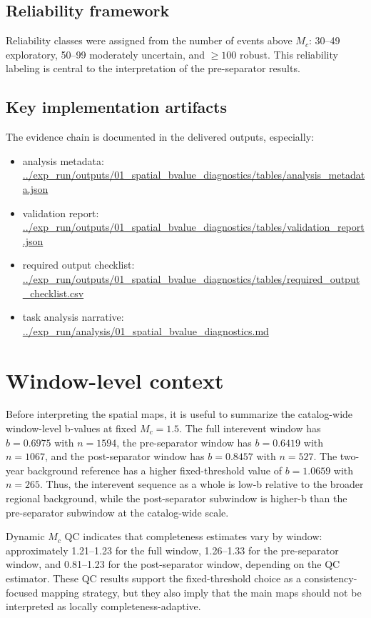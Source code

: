 \documentclass[11pt]{article}
\begin{document}
\subsection{Reliability framework}
Reliability classes were assigned from the number of events above $M_c$: 30--49 exploratory, 50--99 moderately uncertain, and $\ge 100$ robust. This reliability labeling is central to the interpretation of the pre-separator results.

\subsection{Key implementation artifacts}
The evidence chain is documented in the delivered outputs, especially:
\begin{itemize}[leftmargin=1.5em]
\item analysis metadata: \url{../exp_run/outputs/01_spatial_bvalue_diagnostics/tables/analysis_metadata.json}
\item validation report: \url{../exp_run/outputs/01_spatial_bvalue_diagnostics/tables/validation_report.json}
\item required output checklist: \url{../exp_run/outputs/01_spatial_bvalue_diagnostics/tables/required_output_checklist.csv}
\item task analysis narrative: \url{../exp_run/analysis/01_spatial_bvalue_diagnostics.md}
\end{itemize}

\section{Window-level context}
Before interpreting the spatial maps, it is useful to summarize the catalog-wide window-level b-values at fixed $M_c=1.5$. The full interevent window has $b=0.6975$ with $n=1594$, the pre-separator window has $b=0.6419$ with $n=1067$, and the post-separator window has $b=0.8457$ with $n=527$. The two-year background reference has a higher fixed-threshold value of $b=1.0659$ with $n=265$. Thus, the interevent sequence as a whole is low-b relative to the broader regional background, while the post-separator subwindow is higher-b than the pre-separator subwindow at the catalog-wide scale.

Dynamic $M_c$ QC indicates that completeness estimates vary by window: approximately 1.21--1.23 for the full window, 1.26--1.33 for the pre-separator window, and 0.81--1.23 for the post-separator window, depending on the QC estimator. These QC results support the fixed-threshold choice as a consistency-focused mapping strategy, but they also imply that the main maps should not be interpreted as locally completeness-adaptive.
\end{document}
